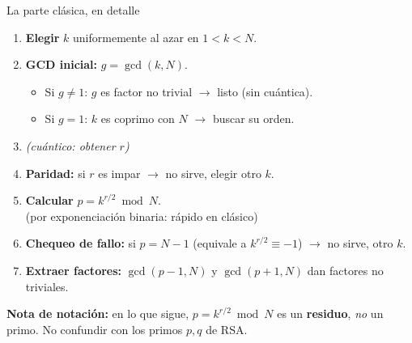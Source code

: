 \documentclass[aspectratio=169]{beamer}
\begin{document}
\begin{frame}{La parte clásica, en detalle}
  \begin{enumerate}
    \item \textbf{Elegir} $k$ uniformemente al azar en $1<k<N$.
    \item \textbf{GCD inicial:} $g=\gcd(k,N)$.
      \begin{itemize}
        \item Si $g\neq 1$: $g$ es factor no trivial $\to$ listo (sin cuántica).
        \item Si $g=1$: $k$ es coprimo con $N$ $\to$ buscar su orden.
      \end{itemize}
    \item \textit{(cuántico: obtener $r$)}
    \item \textbf{Paridad:} si $r$ es impar $\to$ no sirve, elegir otro $k$.
    \item \textbf{Calcular} $p = k^{r/2}\bmod N$.\\
          \textcolor{clasico!70}{\small(por exponenciación binaria: rápido en clásico)}
    \item \textbf{Chequeo de fallo:} si $p = N-1$ (equivale a $k^{r/2}\equiv -1$)
          $\to$ no sirve, otro $k$.
    \item \textbf{Extraer factores:} $\gcd(p-1,N)$ y $\gcd(p+1,N)$ dan
          factores no triviales.
  \end{enumerate}

  \begin{block}{}
    \small\textbf{Nota de notación:} en lo que sigue,
    $p=k^{r/2}\bmod N$ es un \textbf{residuo}, \emph{no} un primo.
    No confundir con los primos $p,q$ de RSA.
  \end{block}

\end{frame}
\end{document}
